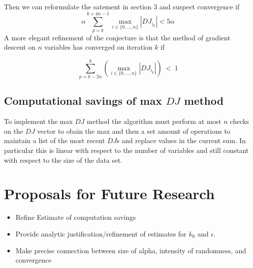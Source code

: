 \documentclass[11pt]{article} %
\begin{document}
Then we can reformulate the satement in section 3 and suspect convergence if 
$$\alpha \sum_{p=k}^{k+4n-1} \max_{i \in \{0, \dots , n\}} |DJ_{i_{p}}| < 5\alpha$$
 A more elegant refinement of the conjecture is that the method of gradient descent on $n$ variables has converged on iteration $k$ if 

$$\sum_{p=k-2n}^{k} \left( \max_{i \in \{0, \dots , n\}} |DJ_{i_{p}}| \right)\  <\ 1 $$  

\subsection{Computational savings of max $DJ$ method}
To implement the max $DJ$ method the algorithm must perform at most $n$ checks on the $DJ$ vector to obain the max and then a set amount of operations to maintain a list of the most recent $DJ$s and replace values in the current sum.  In particular this is linear with respect to the number of variables and still constant with respect to the size of the data set. 


  



\section{Proposals for Future Research}
\begin{itemize}
\item Refine Estimate of computation savings 

\item Provide analytic justification/refinement of estimates for $k_{0}$ and $\epsilon$. 

\item Make precise connection between size of alpha, intensity of randomness, and convergence

\end{itemize}
\end{document}
